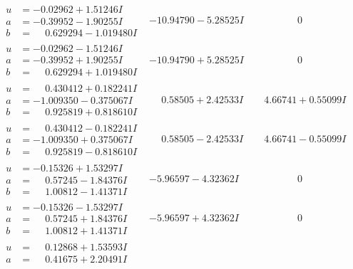 \documentclass[1p]{elsarticle_modified}
\theoremstyle{definition}
\begin{document}
$$\begin{array}{c|c|c}
 \hline 
\begin{aligned}
u &= -0.02962 + 1.51246 I \\
a &= -0.39952 - 1.90255 I \\
b &= \phantom{-}0.629294 - 1.019480 I\end{aligned}
 & -10.94790 - 5.28525 I & \phantom{-0.000000 } 0 \\ \hline\begin{aligned}
u &= -0.02962 - 1.51246 I \\
a &= -0.39952 + 1.90255 I \\
b &= \phantom{-}0.629294 + 1.019480 I\end{aligned}
 & -10.94790 + 5.28525 I & \phantom{-0.000000 } 0 \\ \hline\begin{aligned}
u &= \phantom{-}0.430412 + 0.182241 I \\
a &= -1.009350 - 0.375067 I \\
b &= \phantom{-}0.925819 + 0.818610 I\end{aligned}
 & \phantom{-}0.58505 + 2.42533 I & \phantom{-}4.66741 + 0.55099 I \\ \hline\begin{aligned}
u &= \phantom{-}0.430412 - 0.182241 I \\
a &= -1.009350 + 0.375067 I \\
b &= \phantom{-}0.925819 - 0.818610 I\end{aligned}
 & \phantom{-}0.58505 - 2.42533 I & \phantom{-}4.66741 - 0.55099 I \\ \hline\begin{aligned}
u &= -0.15326 + 1.53297 I \\
a &= \phantom{-}0.57245 - 1.84376 I \\
b &= \phantom{-}1.00812 - 1.41371 I\end{aligned}
 & -5.96597 - 4.32362 I & \phantom{-0.000000 } 0 \\ \hline\begin{aligned}
u &= -0.15326 - 1.53297 I \\
a &= \phantom{-}0.57245 + 1.84376 I \\
b &= \phantom{-}1.00812 + 1.41371 I\end{aligned}
 & -5.96597 + 4.32362 I & \phantom{-0.000000 } 0 \\ \hline\begin{aligned}
u &= \phantom{-}0.12868 + 1.53593 I \\
a &= \phantom{-}0.41675 + 2.20491 I \\

\end{aligned}
\end{array}$$
\end{document}
